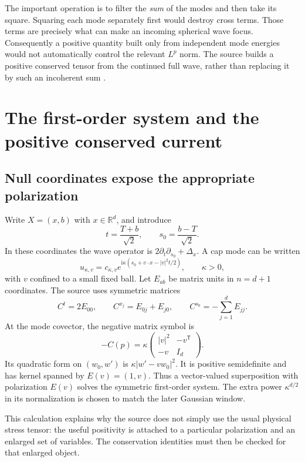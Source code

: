 \documentclass[11pt,a4paper]{article}
\numberwithin{equation}{section}
\theoremstyle{definition}
\theoremstyle{remark}
\newcommand{\R}{\mathbb R}
\begin{document}
The important operation is to filter the \emph{sum} of the modes and then take
its square. Squaring each mode separately first would destroy cross terms.
Those terms are precisely what can make an incoming spherical wave focus.
Consequently a positive quantity built only from independent mode energies
would not automatically control the relevant $L^p$ norm. The source builds a
positive conserved tensor from the continued full wave, rather than replacing
it by such an incoherent sum \cite{current}.

\section{The first-order system and the positive conserved current}
\label{sec:current}
\subsection{Null coordinates expose the appropriate polarization}
Write $X=(x,b)$ with $x\in\R^d$, and introduce
\[
 t=\frac{T+b}{\sqrt2},\qquad s_0=\frac{b-T}{\sqrt2}.
\]
In these coordinates the wave operator is
$2\partial_t\partial_{s_0}+\Delta_x$. A cap mode can be written
\[
 u_{\kappa,v}=c_{\kappa,v}
   e^{\mathrm i\kappa(s_0+v\cdot x-|v|^2t/2)},
 \qquad \kappa>0,
\]
with $v$ confined to a small fixed ball. Let $E_{ab}$ be matrix units in
$n=d+1$ coordinates. The source uses symmetric matrices
\[
 C^t=2E_{00},\qquad C^{x_j}=E_{0j}+E_{j0},\qquad
 C^{s_0}=-\sum_{j=1}^dE_{jj}.
\]
At the mode covector, the negative matrix symbol is
\begin{equation}\label{eq:symbol}
 -C(p)=\kappa
 \begin{pmatrix}|v|^2&-v^{\mathsf T}\\-v&I_d\end{pmatrix}.
\end{equation}
Its quadratic form on $(w_0,w')$ is
$\kappa|w'-vw_0|^2$. It is positive semidefinite and has kernel spanned by
$E(v)=(1,v)$. Thus a vector-valued superposition with polarization $E(v)$
solves the symmetric first-order system. The extra power $\kappa^{d/2}$ in
its normalization is chosen to match the later Gaussian window.

This calculation explains why the source does not simply use the usual
physical stress tensor: the useful positivity is attached to a particular
polarization and an enlarged set of variables. The conservation identities
must then be checked for that enlarged object.
\end{document}
